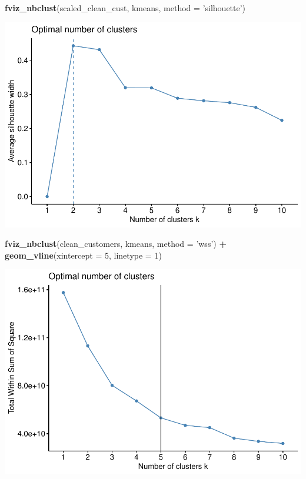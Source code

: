 \documentclass[
  english,
  man]{apa6}
\newenvironment{Shaded}{\begin{snugshade}}{\end{snugshade}}
\newcommand{\DataTypeTok}[1]{\textcolor[rgb]{0.13,0.29,0.53}{#1}}
\newcommand{\DecValTok}[1]{\textcolor[rgb]{0.00,0.00,0.81}{#1}}
\newcommand{\KeywordTok}[1]{\textcolor[rgb]{0.13,0.29,0.53}{\textbf{#1}}}
\newcommand{\NormalTok}[1]{#1}
\newcommand{\OperatorTok}[1]{\textcolor[rgb]{0.81,0.36,0.00}{\textbf{#1}}}
\newcommand{\StringTok}[1]{\textcolor[rgb]{0.31,0.60,0.02}{#1}}
\begin{document}
\begin{Shaded}
\begin{Highlighting}[]
\KeywordTok{fviz_nbclust}\NormalTok{(scaled_clean_cust, kmeans, }\DataTypeTok{method =} \StringTok{'silhouette'}\NormalTok{)}
\end{Highlighting}
\end{Shaded}

\includegraphics{MSDS680-Week-6-Kmeans-and-HCA_files/figure-latex/kmeans investigation-4.pdf}

\begin{Shaded}
\begin{Highlighting}[]
\KeywordTok{fviz_nbclust}\NormalTok{(clean_customers, kmeans, }\DataTypeTok{method =} \StringTok{'wss'}\NormalTok{) }\OperatorTok{+}
\StringTok{  }\KeywordTok{geom_vline}\NormalTok{(}\DataTypeTok{xintercept =} \DecValTok{5}\NormalTok{, }\DataTypeTok{linetype =} \DecValTok{1}\NormalTok{)}
\end{Highlighting}
\end{Shaded}

\includegraphics{MSDS680-Week-6-Kmeans-and-HCA_files/figure-latex/kmeans investigation-5.pdf}
\end{document}
